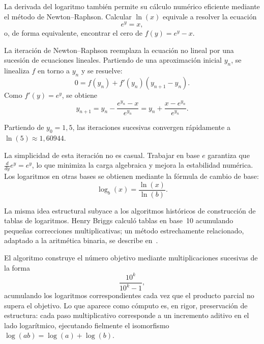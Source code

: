 
\medskip

La derivada del logaritmo también permite su cálculo numérico eficiente
mediante el método de Newton--Raphson.
Calcular $\ln(x)$ equivale a resolver la ecuación
\[
e^y = x,
\]
o, de forma equivalente, encontrar el cero de $f(y) = e^y - x$.

\medskip

La iteración de Newton--Raphson reemplaza la ecuación no lineal por una
sucesión de ecuaciones lineales.
Partiendo de una aproximación inicial $y_n$, se linealiza $f$ en torno a $y_n$
y se resuelve:
\[
0 = f(y_n) + f'(y_n)(y_{n+1}-y_n).
\]
Como $f'(y) = e^y$, se obtiene
\[
y_{n+1} = y_n - \frac{e^{y_n}-x}{e^{y_n}}
         = y_n + \frac{x - e^{y_n}}{e^{y_n}}.
\]

Partiendo de $y_0 = 1{,}5$, las iteraciones sucesivas convergen rápidamente a
$\ln(5) \approx 1{,}60944$.

\medskip

La simplicidad de esta iteración no es casual.
Trabajar en base $e$ garantiza que $\frac{d}{dy}e^y = e^y$,
lo que minimiza la carga algebraica y mejora la estabilidad numérica.
Los logaritmos en otras bases se obtienen mediante la fórmula de cambio de base:
\[
\log_{b}(x) = \frac{\ln(x)}{\ln(b)}.
\]


\medskip

La misma idea estructural subyace a los algoritmos históricos de construcción
de tablas de logaritmos.
Henry Briggs calculó tablas en base~10 acumulando pequeñas correcciones
multiplicativas; un método estrechamente relacionado, adaptado a la aritmética
binaria, se describe en~\cite{knuth}.

\medskip

El algoritmo construye el número objetivo mediante multiplicaciones sucesivas
de la forma
\[
\frac{10^k}{10^k-1},
\]
acumulando los logaritmos correspondientes cada vez que el producto parcial no
supera el objetivo.
Lo que aparece como cómputo es, en rigor, preservación de estructura:
cada paso multiplicativo corresponde a un incremento aditivo en el lado
logarítmico, ejecutando fielmente el isomorfismo $\log(ab) = \log(a) + \log(b)$.

